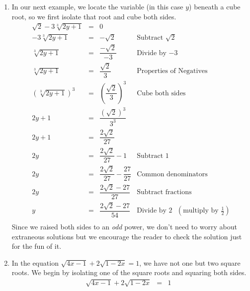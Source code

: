 \documentclass{ximera}
\begin{document}
\begin{example}
\begin{enumerate}
\item  In our next example, we locate the variable (in this case $y$) beneath a cube root, so we first isolate that root and cube both sides. \[ \begin{array}{rclr}


\sqrt{2} - 3\sqrt[3]{2y+1} &  = &  0 & \\[2pt]

- 3\sqrt[3]{2y+1} &  = &  - \sqrt{2} & \text{Subtract $\sqrt{2}$} \\[2pt]

\sqrt[3]{2y+1} & = & \dfrac{-\sqrt{2}}{-3} & \text{Divide by $-3$} \\[8pt]

\sqrt[3]{2y+1} & = & \dfrac{\sqrt{2}}{3}  & \text{Properties of Negatives} \\[8pt]

(\sqrt[3]{2y+1})^3 & = & \left( \dfrac{\sqrt{2}}{3} \right)^{3} & \text{Cube both sides} \\[12pt]

2y + 1 & = & \dfrac{(\sqrt{2})^3}{3^3} & \\[8pt]

2y + 1 & = & \dfrac{2\sqrt{2}}{27} & \\ [8pt]
2y  & = & \dfrac{2 \sqrt{2}}{27}  - 1 & \text{Subtract $1$} \\[8pt]

2y  & = & \dfrac{2 \sqrt{2}}{27}  - \dfrac{27}{27} & \text{Common denominators} \\ [8pt]

2y  & = & \dfrac{2 \sqrt{2} - 27}{27} & \text{Subtract fractions} \\[8pt]

y  & = & \dfrac{2 \sqrt{2} - 27}{54} & \text{Divide by $2$ $\left(\text{multiply by $\frac{1}{2}$} \right)$} \\

\end{array}\] Since we raised both sides to an \textit{odd} power, we don't need to worry about extraneous solutions but we encourage the reader to check the solution just for the fun of it.

\item In the equation $\sqrt{4x-1}  + 2\sqrt{1 - 2x} = 1$, we have not one but two square roots.  We begin by isolating one of the square roots and squaring both sides.\[ \begin{array}{rclr}

\sqrt{4x-1}  + 2\sqrt{1 - 2x} & = & 1 & \\ [2pt]


\end{array}\]
\end{enumerate}
\end{example}
\end{document}
